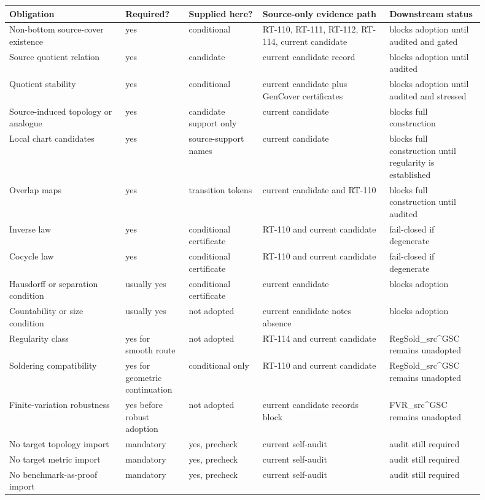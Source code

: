 \documentclass[11pt]{article}
\begin{document}
\begin{longtable}{|p{0.22\linewidth}|p{0.12\linewidth}|p{0.14\linewidth}|p{0.24\linewidth}|p{0.18\linewidth}|}
\hline
\textbf{Obligation} & \textbf{Required?} & \textbf{Supplied here?} &
\textbf{Source-only evidence path} & \textbf{Downstream status} \\
\hline
Non-bottom source-cover existence & yes & conditional & RT-110, RT-111,
RT-112, RT-114, current candidate & blocks adoption until audited and gated \\
\hline
Source quotient relation & yes & candidate & current candidate record &
blocks adoption until audited \\
\hline
Quotient stability & yes & conditional & current candidate plus GenCover
certificates & blocks adoption until audited and stressed \\
\hline
Source-induced topology or analogue & yes & candidate support only & current
candidate & blocks full construction \\
\hline
Local chart candidates & yes & source-support names & current candidate &
blocks full construction until regularity is established \\
\hline
Overlap maps & yes & transition tokens & current candidate and RT-110 &
blocks full construction until audited \\
\hline
Inverse law & yes & conditional certificate & RT-110 and current candidate &
fail-closed if degenerate \\
\hline
Cocycle law & yes & conditional certificate & RT-110 and current candidate &
fail-closed if degenerate \\
\hline
Hausdorff or separation condition & usually yes & conditional certificate &
current candidate & blocks adoption \\
\hline
Countability or size condition & usually yes & not adopted & current
candidate notes absence & blocks adoption \\
\hline
Regularity class & yes for smooth route & not adopted & RT-114 and current
candidate & RegSold_src^GSC remains unadopted \\
\hline
Soldering compatibility & yes for geometric continuation & conditional only &
RT-110 and current candidate & RegSold_src^GSC remains unadopted \\
\hline
Finite-variation robustness & yes before robust adoption & not adopted &
current candidate records block & FVR_src^GSC remains unadopted \\
\hline
No target topology import & mandatory & yes, precheck & current self-audit &
audit still required \\
\hline
No target metric import & mandatory & yes, precheck & current self-audit &
audit still required \\
\hline
No benchmark-as-proof import & mandatory & yes, precheck & current self-audit &
audit still required \\
\hline
\end{longtable}
\end{document}
